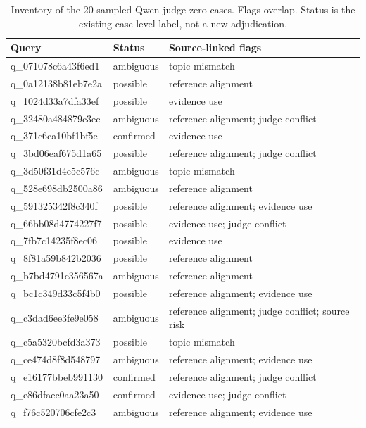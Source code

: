 \begin{table}[ht]
\centering
\small
\setlength{\tabcolsep}{3pt}
\caption{Inventory of the 20 sampled Qwen judge-zero cases. Flags overlap.
Status is the existing case-level label, not a new adjudication.}
\label{tab:case-inventory}
\begin{tabular}{@{}lll@{}}
\toprule
Query & Status & Source-linked flags \\
\midrule
q\_071078c6a43f6ed1 & ambiguous & topic mismatch \\
q\_0a12138b81eb7e2a & possible & reference alignment \\
q\_1024d33a7dfa33ef & possible & evidence use \\
q\_32480a484879c3ec & ambiguous & reference alignment; judge conflict \\
q\_371c6ca10bf1bf5e & confirmed & evidence use \\
q\_3bd06eaf675d1a65 & possible & reference alignment; judge conflict \\
q\_3d50f31d4e5c576c & ambiguous & topic mismatch \\
q\_528e698db2500a86 & ambiguous & reference alignment \\
q\_591325342f8c340f & possible & reference alignment; evidence use \\
q\_66bb08d4774227f7 & possible & evidence use; judge conflict \\
q\_7fb7c14235f8ec06 & possible & evidence use \\
q\_8f81a59b842b2036 & possible & reference alignment \\
q\_b7bd4791c356567a & ambiguous & reference alignment \\
q\_bc1c349d33c5f4b0 & possible & reference alignment; evidence use \\
q\_c3dad6ee3fe9e058 & ambiguous & reference alignment; judge conflict; source risk \\
q\_c5a5320bcfd3a373 & possible & topic mismatch \\
q\_ce474d8f8d548797 & ambiguous & reference alignment; evidence use \\
q\_e16177bbeb991130 & confirmed & reference alignment; judge conflict \\
q\_e86dfaec0aa23a50 & confirmed & evidence use; judge conflict \\
q\_f76c520706cfe2c3 & ambiguous & reference alignment; evidence use \\
\bottomrule
\end{tabular}
\end{table}

